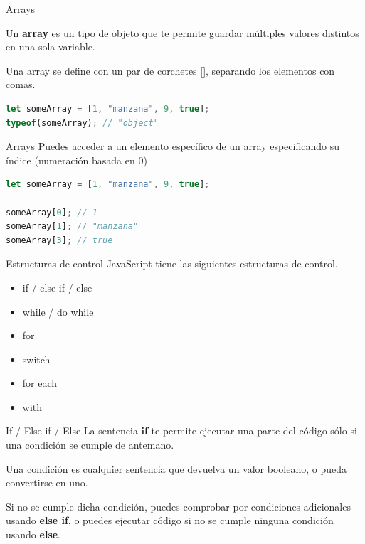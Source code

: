 \documentclass{beamer}
\begin{document}
\begin{frame}[fragile]{Arrays}

Un \textbf{array} es un tipo de objeto que te permite guardar múltiples valores distintos en una sola variable.

Una array se define con un par de corchetes [], separando los elementos con comas.

\begin{lstlisting}[language=JavaScript]
let someArray = [1, "manzana", 9, true];
typeof(someArray); // "object"
\end{lstlisting}


\end{frame}

\begin{frame}[fragile]{Arrays}
Puedes acceder a un elemento específico de un array especificando su índice (numeración basada en 0)

\begin{lstlisting}[language=JavaScript]
let someArray = [1, "manzana", 9, true];

someArray[0]; // 1
someArray[1]; // "manzana"
someArray[3]; // true
\end{lstlisting} 
\end{frame}


\begin{frame}{Estructuras de control}
JavaScript tiene las siguientes estructuras de control.
\begin{itemize}
    \item if / else if / else
    \item while / do while
    \item for
    \item switch
    \item for each
    \item with
\end{itemize}
\end{frame}

\begin{frame}{If / Else if / Else}
La sentencia \textbf{if} te permite ejecutar una parte del código sólo si una condición se cumple de antemano. \pause

Una condición es cualquier sentencia que devuelva un valor booleano, o pueda convertirse en uno.

Si no se cumple dicha condición, puedes comprobar por condiciones adicionales usando \textbf{else if}, o puedes ejecutar código si no se cumple ninguna condición usando \textbf{else}.
\end{frame}
\end{document}
